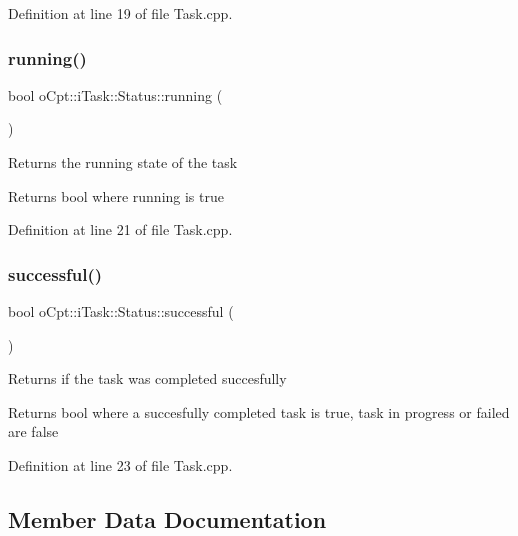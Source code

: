 Definition at line 19 of file Task.\+cpp.

\hypertarget{classo_cpt_1_1i_task_1_1_status_aeaab915a0c1d317727087f070d5d64a1}{}\label{classo_cpt_1_1i_task_1_1_status_aeaab915a0c1d317727087f070d5d64a1} 
\subsubsection{\texorpdfstring{running()}{running()}}
{\footnotesize\ttfamily bool o\+Cpt\+::i\+Task\+::\+Status\+::running (\begin{DoxyParamCaption}{ }\end{DoxyParamCaption})}

Returns the running state of the task \begin{DoxyReturn}{Returns}
bool where running is true 
\end{DoxyReturn}


Definition at line 21 of file Task.\+cpp.

\hypertarget{classo_cpt_1_1i_task_1_1_status_a4140c14ea06f86f87553fa979ccd1836}{}\label{classo_cpt_1_1i_task_1_1_status_a4140c14ea06f86f87553fa979ccd1836} 
\subsubsection{\texorpdfstring{successful()}{successful()}}
{\footnotesize\ttfamily bool o\+Cpt\+::i\+Task\+::\+Status\+::successful (\begin{DoxyParamCaption}{ }\end{DoxyParamCaption})}

Returns if the task was completed succesfully \begin{DoxyReturn}{Returns}
bool where a succesfully completed task is true, task in progress or failed are false 
\end{DoxyReturn}


Definition at line 23 of file Task.\+cpp.



\subsection{Member Data Documentation}
\hypertarget{classo_cpt_1_1i_task_1_1_status_acaf00b89021b6b962cc0fe8d8ea01b85}{}\label{classo_cpt_1_1i_task_1_1_status_acaf00b89021b6b962cc0fe8d8ea01b85} 
